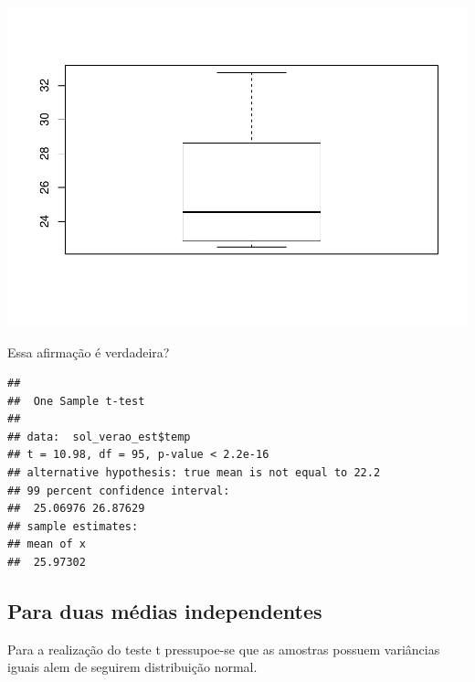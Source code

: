 \documentclass[
]{book}
\newenvironment{Shaded}{\begin{snugshade}}{\end{snugshade}}
\newcommand{\CommentTok}[1]{\textcolor[rgb]{0.56,0.35,0.01}{\textit{#1}}}
\newcommand{\DataTypeTok}[1]{\textcolor[rgb]{0.13,0.29,0.53}{#1}}
\newcommand{\FloatTok}[1]{\textcolor[rgb]{0.00,0.00,0.81}{#1}}
\newcommand{\KeywordTok}[1]{\textcolor[rgb]{0.13,0.29,0.53}{\textbf{#1}}}
\newcommand{\NormalTok}[1]{#1}
\newcommand{\OperatorTok}[1]{\textcolor[rgb]{0.81,0.36,0.00}{\textbf{#1}}}
\newcommand{\StringTok}[1]{\textcolor[rgb]{0.31,0.60,0.02}{#1}}
\begin{document}
\includegraphics{TudodoR_files/figure-latex/unnamed-chunk-253-1.pdf}

Essa afirmação é verdadeira?

\begin{Shaded}
\end{Shaded}

\begin{verbatim}
## 
##  One Sample t-test
## 
## data:  sol_verao_est$temp
## t = 10.98, df = 95, p-value < 2.2e-16
## alternative hypothesis: true mean is not equal to 22.2
## 99 percent confidence interval:
##  25.06976 26.87629
## sample estimates:
## mean of x 
##  25.97302
\end{verbatim}

\hypertarget{para-duas-muxe9dias-independentes}{%
\subsection{Para duas médias independentes}\label{para-duas-muxe9dias-independentes}}

Para a realização do teste t pressupoe-se que as amostras possuem variâncias iguais
alem de seguirem distribuição normal.
\end{document}
